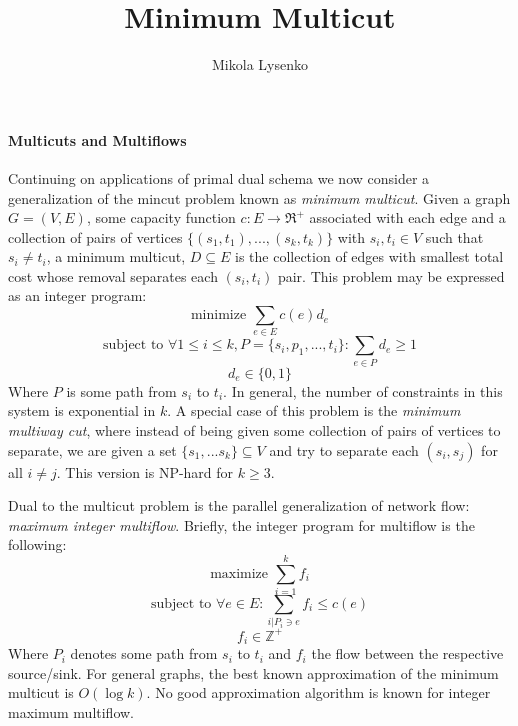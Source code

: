 \documentclass{article}
\title{Minimum Multicut}
\author{Mikola Lysenko}
\begin{document}
\maketitle{}

\paragraph{Multicuts and Multiflows} Continuing on applications of primal dual schema we now consider a generalization of the mincut problem known as \emph{minimum multicut}.  Given a graph $G = (V,E)$, some capacity function $c : E \rightarrow \Re^+$ associated with each edge and a collection of pairs of vertices $\{ (s_1, t_1), ..., (s_k, t_k) \}$ with $s_i, t_i \in V$ such that $s_i \neq t_i$, a minimum multicut, $D \subseteq E$ is the collection of edges with smallest total cost whose removal separates each $(s_i, t_i)$ pair.  This problem may be expressed as an integer program:
\[ \textrm{minimize } \sum \limits_{e \in E} c(e) d_e \]
\[ \textrm{subject to } \forall 1 \leq i \leq k, P = \{ s_i, p_1, ..., t_i \}  : \sum \limits_{e \in P} d_e \geq 1 \]
\[ d_e \in \{ 0, 1 \} \]
Where $P$ is some path from $s_i$ to $t_i$.  In general, the number of constraints in this system is exponential in $k$.  A special case of this problem is the \emph{minimum multiway cut}, where instead of being given some collection of pairs of vertices to separate, we are given a set $\{ s_1, ... s_k \} \subseteq V$ and try to separate each $(s_i, s_j)$ for all $i \neq j$.  This version is NP-hard for $k \geq 3$.

Dual to the multicut problem is the parallel generalization of network flow: \emph{maximum integer multiflow}.  Briefly, the integer program for multiflow is the following:
\[ \textrm{maximize } \sum \limits_{i=1}^k f_i \]
\[ \textrm{subject to } \forall e \in E : \sum \limits_{i | P_i \ni e} f_i \leq c(e) \]
\[ f_i \in \mathbb{Z}^+ \]
Where $P_i$ denotes some path from $s_i$ to $t_i$ and $f_i$ the flow between the respective source/sink.  For general graphs, the best known approximation of the minimum multicut is $O(\log k)$.  No good approximation algorithm is known for integer maximum multiflow.
\end{document}
